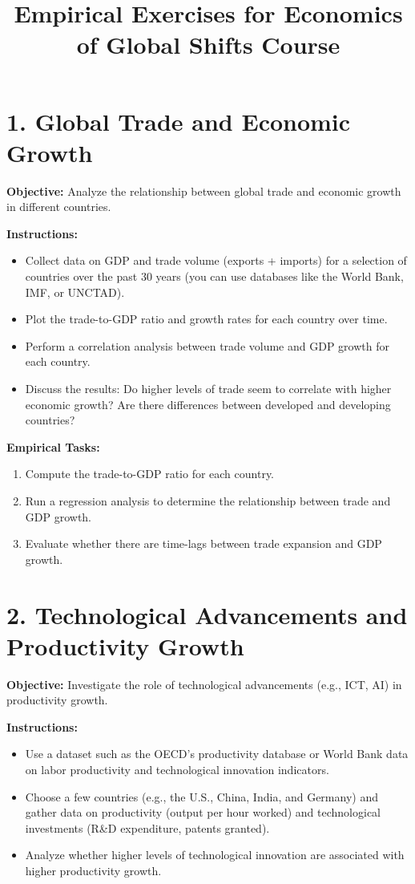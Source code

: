 \documentclass{article}
\title{Empirical Exercises for Economics of Global Shifts Course}
\author{}
\date{}
\begin{document}
\maketitle

\section*{1. Global Trade and Economic Growth}
\textbf{Objective:} Analyze the relationship between global trade and economic growth in different countries.

\textbf{Instructions:}
\begin{itemize}
    \item Collect data on GDP and trade volume (exports + imports) for a selection of countries over the past 30 years (you can use databases like the World Bank, IMF, or UNCTAD).
    \item Plot the trade-to-GDP ratio and growth rates for each country over time.
    \item Perform a correlation analysis between trade volume and GDP growth for each country.
    \item Discuss the results: Do higher levels of trade seem to correlate with higher economic growth? Are there differences between developed and developing countries?
\end{itemize}

\textbf{Empirical Tasks:}
\begin{enumerate}
    \item Compute the trade-to-GDP ratio for each country.
    \item Run a regression analysis to determine the relationship between trade and GDP growth.
    \item Evaluate whether there are time-lags between trade expansion and GDP growth.
\end{enumerate}

\section*{2. Technological Advancements and Productivity Growth}
\textbf{Objective:} Investigate the role of technological advancements (e.g., ICT, AI) in productivity growth.

\textbf{Instructions:}
\begin{itemize}
    \item Use a dataset such as the OECD’s productivity database or World Bank data on labor productivity and technological innovation indicators.
    \item Choose a few countries (e.g., the U.S., China, India, and Germany) and gather data on productivity (output per hour worked) and technological investments (R\&D expenditure, patents granted).
    \item Analyze whether higher levels of technological innovation are associated with higher productivity growth.
\end{itemize}
\end{document}
